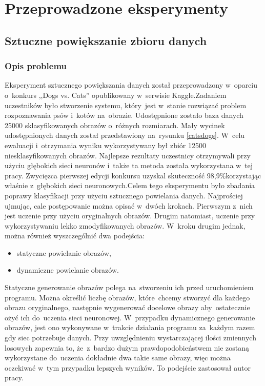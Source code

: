 \section{Przeprowadzone eksperymenty} \label{results}


\subsection{Sztuczne powiększanie zbioru danych}
\subsubsection{Opis problemu}
Eksperyment sztucznego powiększania danych został przeprowadzony w~oparciu o~konkurs ,,Dogs vs. Cats'' opublikowany w~serwisie Kaggle.\footnotemark Zadaniem uczestników było stworzenie systemu, który~jest w~stanie rozwiązać problem rozpoznawania psów i~kotów na~obrazie. Udostępnione zostało baza danych 25000 sklasyfikowanych obrazów o~różnych rozmiarach. Mały wycinek udostępnionych danych został przedstawiony na~rysunku \ref{catsdogs}. W~celu ewaluacji i~otrzymania wyniku wykorzystywany był zbiór 12500 niesklasyfikowanych obrazów. Najlepsze rezultaty uczestnicy otrzymywali przy użyciu głębokich sieci neuronów i~także ta metoda została wykorzystana w~tej pracy. Zwycięzca pierwszej edycji konkursu uzyskal skuteczność 98,9\%\footnotemark korzystając właśnie z~głębokich sieci neuronowych.Celem tego eksperymentu było zbadania poprawy klasyfikacji przy użyciu sztucznego powielania danych. Najprościej ujmując, cale postępowanie można opisać w~dwóch krokach. Pierwszym z~nich jest uczenie przy użyciu oryginalnych obrazów. Drugim natomiast, uczenie przy wykorzystywaniu lekko zmodyfikowanych obrazów. W~kroku drugim jednak, można również wyszczególnić dwa podejścia:
\begin{itemize}
\item statyczne powielanie obrazów,
\item dynamiczne powielanie obrazów.
\end{itemize}
Statyczne generowanie obrazów polega na~stworzeniu ich przed uruchomieniem programu. Można określić liczbę obrazów, które~chcemy stworzyć dla każdego obrazu oryginalnego, następnie wygenerować docelowe obrazy aby~ostatecznie ożyć ich do~uczenia sieci neuronowej. W~przypadku dynamicznego generowanie obrazów, jest ono wykonywane w~trakcie działania programu za~każdym razem gdy siec potrzebuje danych. Przy uwzględnieniu wystarczającej ilości zmiennych losowych zapewnia to, że~z~bardzo dużym prawdopodobieństwem nie zostaną wykorzystane do~uczenia dokładnie dwa takie same obrazy, więc można oczekiwać w~tym przypadku lepszych wyników. To podejście zastosował autor pracy.

